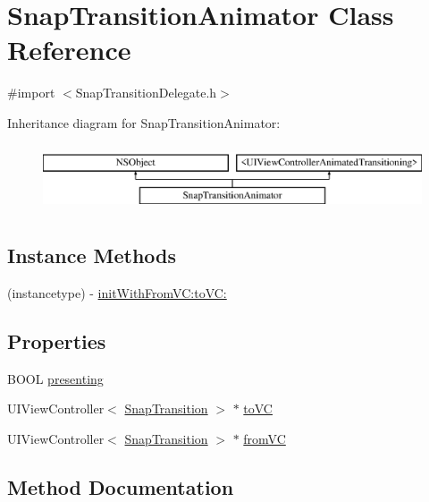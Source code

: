 \hypertarget{interface_snap_transition_animator}{}\section{Snap\+Transition\+Animator Class Reference}
\label{interface_snap_transition_animator}


{\ttfamily \#import $<$Snap\+Transition\+Delegate.\+h$>$}

Inheritance diagram for Snap\+Transition\+Animator\+:\begin{figure}[H]
\begin{center}
\leavevmode
\includegraphics[height=2.000000cm]{interface_snap_transition_animator}
\end{center}
\end{figure}
\subsection*{Instance Methods}
\begin{DoxyCompactItemize}
\item 
(instancetype) -\/ \hyperlink{interface_snap_transition_animator_a7a2604e49aa0328bd39f02f9a51ff320}{init\+With\+From\+V\+C\+:to\+V\+C\+:}
\end{DoxyCompactItemize}
\subsection*{Properties}
\begin{DoxyCompactItemize}
\item 
B\+O\+OL \hyperlink{interface_snap_transition_animator_a326b257087c19213336c4a30faade718}{presenting}
\item 
U\+I\+View\+Controller$<$ \hyperlink{protocol_snap_transition-p}{Snap\+Transition} $>$ $\ast$ \hyperlink{interface_snap_transition_animator_a3ab09fc392eac91f4fa18230936fba7e}{to\+VC}
\item 
U\+I\+View\+Controller$<$ \hyperlink{protocol_snap_transition-p}{Snap\+Transition} $>$ $\ast$ \hyperlink{interface_snap_transition_animator_a0f91c695757a22bc4f29f58e96a300bd}{from\+VC}
\end{DoxyCompactItemize}


\subsection{Method Documentation}
\hypertarget{interface_snap_transition_animator_a7a2604e49aa0328bd39f02f9a51ff320}{}\label{interface_snap_transition_animator_a7a2604e49aa0328bd39f02f9a51ff320} 
